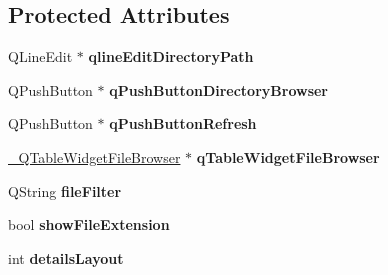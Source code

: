 \subsection*{Protected Attributes}
\begin{DoxyCompactItemize}
\item 
\hypertarget{classQEFileBrowser_a026ad93457dfd2014c35f38bea2f2769}{
QLineEdit $\ast$ {\bfseries qlineEditDirectoryPath}}
\label{classQEFileBrowser_a026ad93457dfd2014c35f38bea2f2769}

\item 
\hypertarget{classQEFileBrowser_a400b89fd7cd444dcdf30674a93391a5a}{
QPushButton $\ast$ {\bfseries qPushButtonDirectoryBrowser}}
\label{classQEFileBrowser_a400b89fd7cd444dcdf30674a93391a5a}

\item 
\hypertarget{classQEFileBrowser_ac6dca4cdddbfa2459558846759af7596}{
QPushButton $\ast$ {\bfseries qPushButtonRefresh}}
\label{classQEFileBrowser_ac6dca4cdddbfa2459558846759af7596}

\item 
\hypertarget{classQEFileBrowser_a977ae6fe8cb1a882e1e7ed5f4f87e4dd}{
\hyperlink{class__QTableWidgetFileBrowser}{\_\-QTableWidgetFileBrowser} $\ast$ {\bfseries qTableWidgetFileBrowser}}
\label{classQEFileBrowser_a977ae6fe8cb1a882e1e7ed5f4f87e4dd}

\item 
\hypertarget{classQEFileBrowser_a81517e91bb4472fa94e90470dceb9913}{
QString {\bfseries fileFilter}}
\label{classQEFileBrowser_a81517e91bb4472fa94e90470dceb9913}

\item 
\hypertarget{classQEFileBrowser_a22fc64a33ab46f091853619502e1810b}{
bool {\bfseries showFileExtension}}
\label{classQEFileBrowser_a22fc64a33ab46f091853619502e1810b}

\item 
\hypertarget{classQEFileBrowser_af0cdf46fe339c319de5e9972c84e1500}{
int {\bfseries detailsLayout}}
\label{classQEFileBrowser_af0cdf46fe339c319de5e9972c84e1500}

\end{DoxyCompactItemize}
